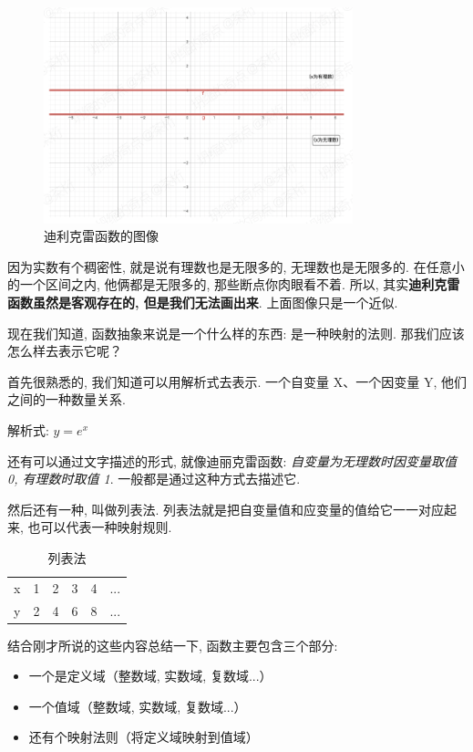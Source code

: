 \begin{figure}[ht]
  \centering
  \includegraphics[width=0.8\textwidth]{asset/97060faa-bcf8-4fdb-8f69-e42425ab9575.png}
  \caption{迪利克雷函数的图像}
  \label{fig:img7_2}
\end{figure}

因为实数有个稠密性, 就是说有理数也是无限多的, 无理数也是无限多的. 在任意小的一个区间之内, 他俩都是无限多的, 那些断点你肉眼看不着. 所以, 其实\textbf{迪利克雷函数虽然是客观存在的, 但是我们无法画出来}. 上面图像只是一个近似. 

现在我们知道, 函数抽象来说是一个什么样的东西: 是一种映射的法则. 那我们应该怎么样去表示它呢？

首先很熟悉的, 我们知道可以用解析式去表示. 一个自变量 X、一个因变量 Y, 他们之间的一种数量关系. 

解析式: \(y = e^x\)

还有可以通过文字描述的形式, 就像迪丽克雷函数: \textit{自变量为无理数时因变量取值 0, 有理数时取值 1}. 一般都是通过这种方式去描述它. 

然后还有一种, 叫做列表法. 列表法就是把自变量值和应变量的值给它一一对应起来, 也可以代表一种映射规则. 

\begin{table}[ht]
  \centering
  \begin{tabular}{llllll}
    \midrule
      x & 1 & 2 & 3 & 4 & ... \\
      y & 2 & 4 & 6 & 8 & ... \\
    \bottomrule
  \end{tabular}
  \caption{列表法}
  \label{tab:table7_1}
\end{table}

结合刚才所说的这些内容总结一下, 函数主要包含三个部分:

\begin{itemize}
  \item 一个是定义域（整数域, 实数域, 复数域...）
  \item 一个值域（整数域, 实数域, 复数域...）
  \item 还有个映射法则（将定义域映射到值域）
\end{itemize}

